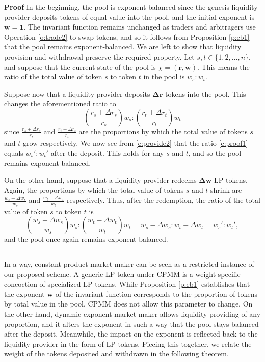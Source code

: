 \documentclass[12pt,a4paper]{article}
\newcommand{\qed}{\rule{.07in}{.1in}}
\newenvironment{proof}{\vspace{1ex}\noindent\textbf{Proof}\hspace{0.5em}}{\hfill\qed\vspace{1ex}}
\begin{document}
\begin{proof}
In the beginning, the pool is exponent-balanced since the genesis liquidity provider deposits tokens of equal value into the pool, and the initial exponent is $\mathbf{w}=\mathbf{1}$. The invariant function remains unchanged as traders and arbitragers use Operation \ref{o:trade2} to swap tokens, and so it follows from Proposition \ref{p:eb1} that the pool remains exponent-balanced. We are left to show that liquidity provision and withdrawal preserve the required property. Let $s,t\in\{1,2,\ldots,n\}$, and suppose that the current state of the pool is $\chi=(\mathbf{r},\mathbf{w})$. This means the ratio of the total value of token $s$ to token $t$ in the pool is $w_s:w_t$.

Suppose now that a liquidity provider deposits $\mathbf{\Delta r}$ tokens into the pool. This changes the aforementioned ratio to
\begin{equation}\label{e:proof1}
\left(\frac{r_s+\Delta r_s}{r_s}\right)w_s:\left(\frac{r_t+\Delta r_t}{r_t}\right)w_t
\end{equation}
since $\frac{r_s+\Delta r_s}{r_s}$ and $\frac{r_t+\Delta r_t}{r_t}$ are the proportions by which the total value of tokens $s$ and $t$ grow respectively. We now see from \eqref{e:provide2} that the ratio \eqref{e:proof1} equals $w_s':w_t'$ after the deposit. This holds for any $s$ and $t$, and so the pool remains exponent-balanced.

On the other hand, suppose that a liquidity provider redeems $\mathbf{\Delta w}$ LP tokens. Again, the proportions by which the total value of tokens $s$ and $t$ shrink are $\frac{w_s-\Delta w_s}{w_s}$ and $\frac{w_t-\Delta w_t}{w_t}$ respectively. Thus, after the redemption, the ratio of the total value of token $s$ to token $t$ is
\[\left(\frac{w_s-\Delta w_s}{w_s}\right)w_s:\left(\frac{w_t-\Delta w_t}{w_t}\right)w_t=w_s-\Delta w_s:w_t-\Delta w_t=w_s':w_t',\]
and the pool once again remains exponent-balanced.
\end{proof}

In a way, constant product market maker can be seen as a restricted instance of our proposed scheme. A generic LP token under CPMM is a weight-specific concoction of specialized LP tokens. While Proposition \ref{p:eb1} establishes that the exponent $\mathbf{w}$ of the invariant function corresponds to the proportion of tokens by total value in the pool, CPMM does not allow this parameter to change. On the other hand, dynamic exponent market maker allows liquidity providing of any proportion, and it alters the exponent in such a way that the pool stays balanced after the deposit. Meanwhile, the impact on the exponent is reflected back to the liquidity provider in the form of LP tokens. Piecing this together, we relate the weight of the tokens deposited and withdrawn in the following theorem.
\end{document}
